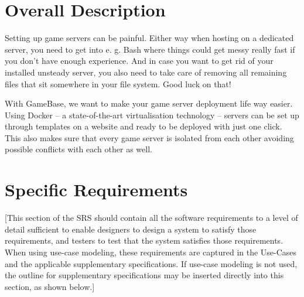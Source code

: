 \documentclass[a4paper,12pt,chapterprefix=false,bibliography=totoc,listof=totoc,]{scrreprt}
\begin{document}
\chapter{Overall Description}
Setting up game servers can be painful. Either way when hosting on a dedicated server, you need to get into e. g. Bash where things could get messy really fast if you don’t have enough experience. And in case you want to get rid of your installed unsteady server, you also need to take care of removing all remaining files that sit somewhere in your file system. Good luck on that!

With GameBase, we want to make your game server deployment life way easier. Using Docker – a state-of-the-art virtualisation technology – servers can be set up through templates on a website and ready to be deployed with just one click. This also makes sure that every game server is isolated from each other avoiding possible conflicts with each other as well.

\chapter{Specific Requirements}
{\color{blue} [This section of the SRS should contain all the software requirements to a level of detail sufficient to enable designers to design a system to satisfy those requirements, and testers to test that the system satisfies those requirements.   When using use-case modeling, these requirements are captured in the Use-Cases and the applicable supplementary specifications.  If use-case modeling is not used, the outline for supplementary specifications may be inserted directly into this section, as shown below.]}
\end{document}
